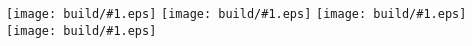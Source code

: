 \documentclass{article}
\newcommand{\Include}[1]{\texttt{[image: build/\#1.eps]}\vspace*{1cm}}
\begin{document}
\centering

\Include{abend-wird-es-wieder}
\Include{kein-schoener-land}
\Include{wenn-alle-bruennlein-fliessen}
\Include{wenn-ich-ein-voeglein-waer}
\end{document}
